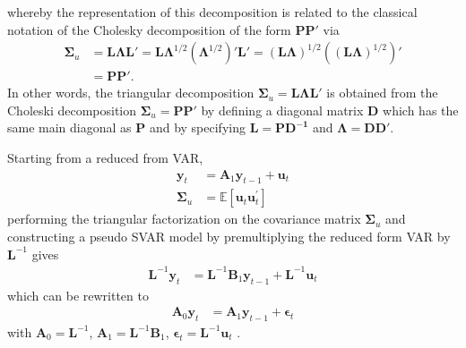 \documentclass[a4paper,11pt,listof=nochaptergap,oneside,pointednumbers,bibtotoc,bigheadings,liststotoc,hidelinks]{scrbook}
\theoremstyle{mysatz}
\theoremstyle{mydefinition}
\theoremstyle{mytheorem}
\theoremstyle{mybemerkung}
\newcommand{\vect}[1]{\boldsymbol{\mathbf{#1}}}
\begin{document}
whereby the representation of this decomposition is related to the classical notation of the Cholesky decomposition of the form $\vect{PP'}$ via
\begin{equation} \label{eq:svar17}
\begin{split}
	\vect{\Sigma}_u & = \vect{L}\vect{\Lambda}\vect{L}' = \vect{L}\vect{\Lambda}^{1/2}(\vect{\Lambda}^{1/2})'\vect{L}' = (\vect{L}\vect{\Lambda})^{1/2}\left ( (\vect{L}\vect{\Lambda})^{1/2}\right )' \\
				& = \vect{P}\vect{P'}.
\end{split}								
\end{equation}
In other words, the triangular decomposition $\vect{\Sigma}_u = \vect{L}\vect{\Lambda}\vect{L'}$ is obtained from the Choleski decomposition $\vect{\Sigma}_u = \vect{P}\vect{P'}$ by defining a diagonal matrix $\vect{D}$ which has the same main diagonal as $\vect{P}$ and by specifying $\vect{L} = \vect{P}\vect{D^{-1}}$ and $\vect{\Lambda} = \vect{D}\vect{D'}$.

Starting from a reduced from VAR,
\begin{equation} \label{eq:svar18}
\begin{split}
	\vect{y}_t & = \vect{A}_1\vect{y}_{t-1} + \vect{u}_t \\
	\vect{\Sigma}_u & = \mathbb{E}[\vect{u}_t\vect{u}_t^']
\end{split}								
\end{equation}
performing the triangular factorization on the covariance matrix $\vect{\Sigma}_u$ and constructing a pseudo SVAR model by premultiplying the reduced form VAR by $\vect{L}^{-1}$ gives
\begin{equation} \label{eq:svar19}
\begin{split}
	\vect{L}^{-1}\vect{y}_t & = \vect{L}^{-1}\vect{B}_1\vect{y}_{t-1} + \vect{L}^{-1}\vect{u}_t
\end{split}								
\end{equation}
which can be rewritten to
\begin{equation} \label{eq:svar21}
\begin{split}
	\vect{A}_0\vect{y}_t & = \vect{A}_1\vect{y}_{t-1} + \vect{\epsilon}_t
\end{split}								
\end{equation}
with $\vect{A}_0 = \vect{L}^{-1}$, $\vect{A}_1 = \vect{L}^{-1}\vect{B}_1$, $\vect{\epsilon}_t = \vect{L}^{-1}\vect{u}_t$ \citep{zivot:00}.
\end{document}
